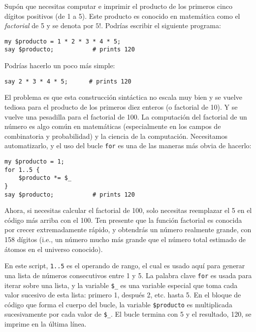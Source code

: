 Supón que necesitas computar e imprimir el producto de los 
primeros cinco dígitos positivos (de 1 a 5). Este producto es
conocido en matemática como el \emph{factorial} de 5 y 
se denota por $5!$. Podrías escribir el siguiente programa:  

\begin{verbatim}
my $producto = 1 * 2 * 3 * 4 * 5;
say $producto;           # prints 120
\end{verbatim}
%

Podrías hacerlo un poco más simple:
\begin{verbatim}
say 2 * 3 * 4 * 5;      # prints 120
\end{verbatim}
%

El problema es que esta construcción sintáctica no 
escala muy bien y se vuelve tediosa para el producto 
de los primeros diez enteros (o factorial de 10). Y
se vuelve una pesadilla para el factorial de 100.
La computación del factorial de un número es algo 
común en matemáticas (especialmente en los campos de 
combinatoria y probabilidad) y la ciencia de la
computación. Necesitamos automatizarlo, y el uso del
bucle {\tt for} es una de las maneras más obvia de hacerlo:

\begin{verbatim}
my $producto = 1;
for 1..5 {
    $producto *= $_
}
say $producto;           # prints 120
\end{verbatim}

Ahora, si necesitas calcular el factorial de 100, solo
necesitas reemplazar el 5 en el código más arriba con el 100.
Ten presente que la función factorial es conocida por 
crecer extremadamente rápido, y obtendrás un número
realmente grande, con 158 dígitos (i.e., un número mucho
más grande que el número total estimado de átomos en el
universo conocido).

En este script, {\tt 1..5} es el operando de rango, el cual
es usado aquí para generar una lista de números consecutivos entre 1 y 5.
La palabra clave {\tt for} es usada para iterar sobre una lista, y 
la variable \verb|$_| es una variable especial que toma cada valor sucesivo
de esta lista: primero 1, después 2, etc. hasta 5. En el bloque
de código que forma el cuerpo del bucle, la variable {\tt \$producto}
es multiplicada sucesivamente por cada valor de \verb|$_|. El bucle
termina con 5 y el resultado, 120, se imprime en la última línea.

